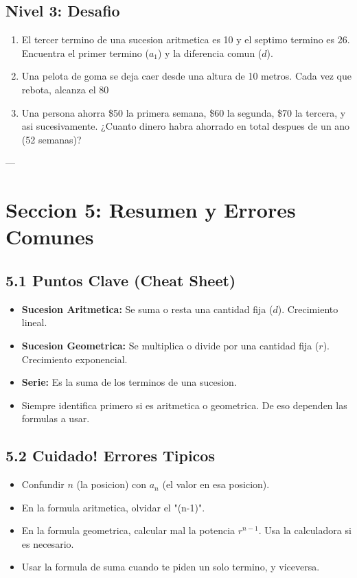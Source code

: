 \documentclass[12pt,a4paper]{article}
\begin{document}
\subsection*{Nivel 3: Desafio}
\begin{enumerate}
    \item El tercer termino de una sucesion aritmetica es 10 y el septimo termino es 26. Encuentra el primer termino ($a_1$) y la diferencia comun ($d$).
    \item Una pelota de goma se deja caer desde una altura de 10 metros. Cada vez que rebota, alcanza el 80%
    \item Una persona ahorra \$50 la primera semana, \$60 la segunda, \$70 la tercera, y asi sucesivamente. ¿Cuanto dinero habra ahorrado en total despues de un ano (52 semanas)?
\end{enumerate}

---

\section*{Seccion 5: Resumen y Errores Comunes}

\subsection*{5.1 Puntos Clave (Cheat Sheet)}
\begin{itemize}
    \item \textbf{Sucesion Aritmetica:} Se suma o resta una cantidad fija ($d$). Crecimiento lineal.
    \item \textbf{Sucesion Geometrica:} Se multiplica o divide por una cantidad fija ($r$). Crecimiento exponencial.
    \item \textbf{Serie:} Es la suma de los terminos de una sucesion.
    \item Siempre identifica primero si es aritmetica o geometrica. De eso dependen las formulas a usar.
\end{itemize}

\subsection*{5.2 Cuidado! Errores Tipicos}
\begin{itemize}
    \item Confundir $n$ (la posicion) con $a_n$ (el valor en esa posicion).
    \item En la formula aritmetica, olvidar el "(n-1)".
    \item En la formula geometrica, calcular mal la potencia $r^{n-1}$. Usa la calculadora si es necesario.
    \item Usar la formula de suma cuando te piden un solo termino, y viceversa.
\end{itemize}
\end{document}
